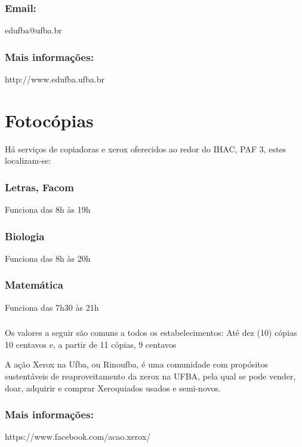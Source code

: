     \subsubsection{Email:}
        edufba@ufba.br
        
    \subsubsection{Mais informações:}  
        http://www.edufba.ufba.br
        
\section{Fotocópias}
    Há serviços de copiadoras e xerox oferecidos ao redor do IHAC, PAF 3, estes localizam-se:

    \subsubsection{Letras, Facom}
        Funciona das 8h às 19h
        
    \subsubsection{Biologia}
        Funciona das 8h às 20h
        
    \subsubsection{Matemática}
        Funciona das 7h30 às 21h
        
    \subsubsection{}
    Os valores a seguir são comuns a todos os estabelecimentos: 
    Até dez (10) cópias 10 centavos e, a partir de 11 cópias, 9 centavos
    
    \begin{remark} 
    A ação Xerox na Ufba, ou Rinoufba, é uma comunidade com propósitos sustentáveis de reaproveitamento da xerox na UFBA, pela qual se pode vender, doar, adquirir e comprar Xeroquiados usados e semi-novos.
    \subsubsection{Mais informações:}
    https://www.facebook.com/acao.xerox/
    \end{remark}
    
